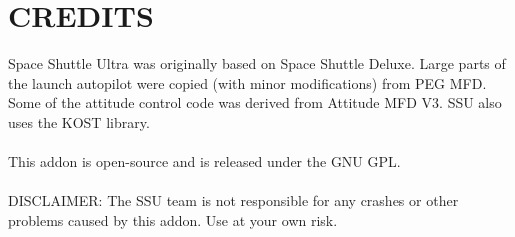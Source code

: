 \documentclass[13pt]{article}
\begin{document}
\newpage
\section{CREDITS}
Space Shuttle Ultra was originally based on Space Shuttle Deluxe. Large parts of the launch autopilot were copied (with minor modifications) from PEG MFD.
Some of the attitude control code was derived from Attitude MFD V3.
SSU also uses the KOST library. \\
\\
This addon is open-source and is released under the GNU GPL. \\
\\
DISCLAIMER: The SSU team is not responsible for any crashes or other problems caused by this addon. Use at your own risk.
\end{document}
